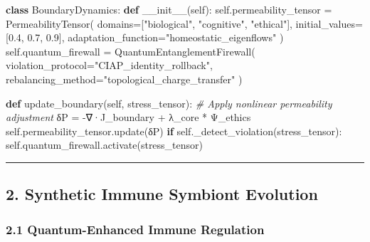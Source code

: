 \documentclass[
]{article}
\newenvironment{Shaded}{}{}
\newcommand{\CommentTok}[1]{\textcolor[rgb]{0.38,0.63,0.69}{\textit{#1}}}
\newcommand{\ControlFlowTok}[1]{\textcolor[rgb]{0.00,0.44,0.13}{\textbf{#1}}}
\newcommand{\FloatTok}[1]{\textcolor[rgb]{0.25,0.63,0.44}{#1}}
\newcommand{\FunctionTok}[1]{\textcolor[rgb]{0.02,0.16,0.49}{#1}}
\newcommand{\KeywordTok}[1]{\textcolor[rgb]{0.00,0.44,0.13}{\textbf{#1}}}
\newcommand{\NormalTok}[1]{#1}
\newcommand{\OperatorTok}[1]{\textcolor[rgb]{0.40,0.40,0.40}{#1}}
\newcommand{\StringTok}[1]{\textcolor[rgb]{0.25,0.44,0.63}{#1}}
\newcommand{\VariableTok}[1]{\textcolor[rgb]{0.10,0.09,0.49}{#1}}
\begin{document}
\begin{Shaded}
\begin{Highlighting}[]
\KeywordTok{class}\NormalTok{ BoundaryDynamics:}
    \KeywordTok{def} \FunctionTok{\_\_init\_\_}\NormalTok{(}\VariableTok{self}\NormalTok{):}
        \VariableTok{self}\NormalTok{.permeability\_tensor }\OperatorTok{=}\NormalTok{ PermeabilityTensor(}
\NormalTok{            domains}\OperatorTok{=}\NormalTok{[}\StringTok{"biological"}\NormalTok{, }\StringTok{"cognitive"}\NormalTok{, }\StringTok{"ethical"}\NormalTok{],}
\NormalTok{            initial\_values}\OperatorTok{=}\NormalTok{[}\FloatTok{0.4}\NormalTok{, }\FloatTok{0.7}\NormalTok{, }\FloatTok{0.9}\NormalTok{],}
\NormalTok{            adaptation\_function}\OperatorTok{=}\StringTok{"homeostatic\_eigenflows"}
\NormalTok{        )}
        \VariableTok{self}\NormalTok{.quantum\_firewall }\OperatorTok{=}\NormalTok{ QuantumEntanglementFirewall(}
\NormalTok{            violation\_protocol}\OperatorTok{=}\StringTok{"CIAP\_identity\_rollback"}\NormalTok{,}
\NormalTok{            rebalancing\_method}\OperatorTok{=}\StringTok{"topological\_charge\_transfer"}
\NormalTok{        )}

    \KeywordTok{def}\NormalTok{ update\_boundary(}\VariableTok{self}\NormalTok{, stress\_tensor):}
        \CommentTok{\# Apply nonlinear permeability adjustment}
\NormalTok{        δP }\OperatorTok{=} \OperatorTok{{-}}\NormalTok{∇·J\_boundary }\OperatorTok{+}\NormalTok{ λ\_core }\OperatorTok{*}\NormalTok{ Ψ\_ethics}
        \VariableTok{self}\NormalTok{.permeability\_tensor.update(δP)}
        \ControlFlowTok{if} \VariableTok{self}\NormalTok{.\_detect\_violation(stress\_tensor):}
            \VariableTok{self}\NormalTok{.quantum\_firewall.activate(stress\_tensor)}
\end{Highlighting}
\end{Shaded}

\begin{center}\rule{0.5\linewidth}{0.5pt}\end{center}

\subsection{\texorpdfstring{\textbf{2. Synthetic Immune Symbiont
Evolution}}{2. Synthetic Immune Symbiont Evolution}}\label{synthetic-immune-symbiont-evolution}

\subsubsection{\texorpdfstring{\textbf{2.1 Quantum-Enhanced Immune
Regulation}}{2.1 Quantum-Enhanced Immune Regulation}}\label{quantum-enhanced-immune-regulation}
\end{document}
